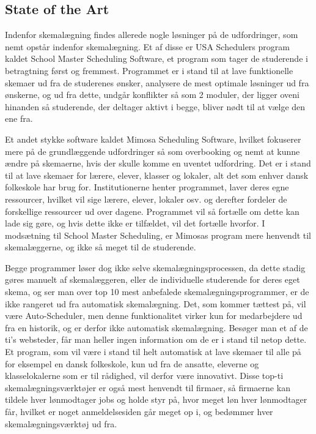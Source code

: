 \subsection{State of the Art}
Indenfor skemalægning findes allerede nogle løsninger på de udfordringer, som nemt opstår indenfor skemalægning. Et af disse er USA Schedulers program kaldet School Master Scheduling Software\cite{USAS}, et program som tager de studerende i betragtning først og fremmest. Programmet er i stand til at lave funktionelle skemaer ud fra de studerenes ønsker, analysere de mest optimale løsninger ud fra ønskerne, og ud fra dette, undgår konflikter så som 2 moduler, der ligger oveni hinanden så studerende, der deltager aktivt i begge, bliver nødt til at vælge den ene fra.

Et andet stykke software kaldet Mimosa Scheduling Software\cite{Mimosa}, hvilket fokuserer mere på de grundlæggende udfordringer så som overbooking og nemt at kunne ændre på skemaerne, hvis der skulle komme en uventet udfordring. Det er i stand til at lave skemaer for lærere, elever, klasser og lokaler, alt det som enhver dansk folkeskole har brug for. Institutionerne henter programmet, laver deres egne ressourcer, hvilket vil sige lærere, elever, lokaler osv. og derefter fordeler de forskellige ressourcer ud over dagene. Programmet vil så fortælle om dette kan lade sig gøre, og hvis dette ikke er tilfældet, vil det fortælle hvorfor\cite{MimosaTutorial}. I modsætning til School Master Scheduling, er Mimosas program mere henvendt til skemalæggerne, og ikke så meget til de studerende. 

Begge programmer løser dog ikke selve skemalægningsprocessen, da dette stadig gøres manuelt af skemalæggeren, eller de individuelle studerende for deres eget skema, og ser man over top 10 mest anbefalede skemalægningsprogrammer\cite{top10Schedulers}, er de ikke rangeret ud fra automatisk skemalægning. Det, som kommer tættest på, vil være Auto-Scheduler, men denne funktionalitet virker kun for medarbejdere ud fra en historik, og er derfor ikke automatisk skemalægning. Besøger man et af de ti's websteder, får man heller ingen information om de er i stand til netop dette. Et program, som vil være i stand til helt automatisk at lave skemaer til alle på for eksempel en dansk folkeskole, kun ud fra de ansatte, eleverne og klasselokalerne som er til rådighed, vil derfor være innovativt. Disse top-ti skemalægningsværktøjer er også mest henvendt til firmaer, så firmaerne kan tildele hver lønmodtager jobs og holde styr på, hvor meget løn hver lønmodtager får, hvilket er noget anmeldelsesiden går meget op i, og bedømmer hver skemalægningsværktøj ud fra.

